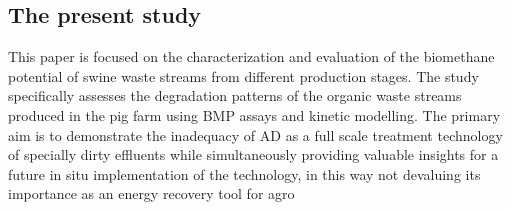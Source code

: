 \subsection{The present study}
This paper is focused on the characterization and evaluation of the biomethane potential of swine waste streams from different production stages. The study specifically assesses the degradation patterns of the organic waste streams produced in the pig farm using BMP assays and kinetic modelling. The primary aim is to demonstrate the inadequacy of AD as a full scale treatment technology of specially dirty effluents while simultaneously providing valuable insights for a future in situ implementation of the technology, in this way not devaluing its importance as an energy recovery tool for agro